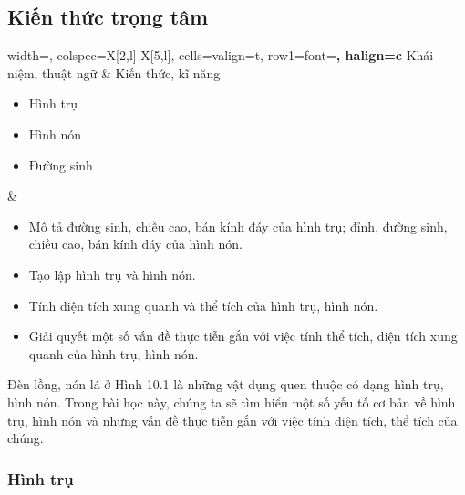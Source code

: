 \begin{lesson}
    \subsection{Kiến thức trọng tâm}

    \begin{center}
    \begin{tblr}{
        width=\linewidth,
        colspec={X[2,l] X[5,l]},
        cells={valign=t},
        row{1}={font=\bfseries, halign=c}
    }
        Khái niệm, thuật ngữ & Kiến thức, kĩ năng \\
        \begin{minipage}[t]{\linewidth}
        \begin{itemize}
            \item Hình trụ
            \item Hình nón
            \item Đường sinh
        \end{itemize}
        \end{minipage}
        &
        \begin{minipage}[t]{\linewidth}
        \begin{itemize}
            \item Mô tả đường sinh, chiều cao, bán kính đáy của hình trụ; đỉnh, đường sinh, chiều cao, bán kính đáy của hình nón.
            \item Tạo lập hình trụ và hình nón.
            \item Tính diện tích xung quanh và thể tích của hình trụ, hình nón.
            \item Giải quyết một số vấn đề thực tiễn gắn với việc tính thể tích, diện tích xung quanh của hình trụ, hình nón.
        \end{itemize}
        \end{minipage}
    \end{tblr}
    \end{center}

    Đèn lồng, nón lá ở Hình 10.1 là những vật dụng quen thuộc có dạng hình trụ, hình nón. Trong bài học này, chúng ta sẽ tìm hiểu một số yếu tố cơ bản về hình trụ, hình nón và những vấn đề thực tiễn gắn với việc tính diện tích, thể tích của chúng.


    \subsubsection{Hình trụ}


\end{lesson}
